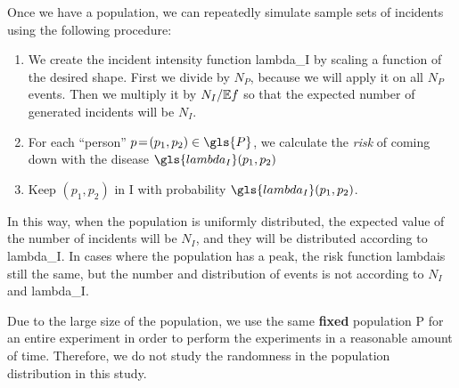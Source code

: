 Once we have a population,
we can repeatedly simulate sample sets of incidents using the following procedure:
\begin{enumerate}
    \item We create the incident intensity function \gls{lambda_I}
        by scaling a function of the desired shape.
        First we divide by $N_P$,
        because we will apply it on all $N_P$ \glspl{event}.
        Then we multiply it by $N_I/\mathbb{E} f$
        so that the expected number of generated \glspl{incident} will be $N_I$.
    \item For each ``person'' $p\!=\!(p_1, p_2) \in \gls{P}$,
        we calculate the \textit{risk} of coming down with the disease $\gls{lambda_I}(p_1, p_2)$
    \item Keep $(p_1, p_2)$ in \gls{I} with probability $\gls{lambda_I}(p_1, p_2)$.
\end{enumerate}

In this way,
when the population is uniformly distributed,
the expected value of the number of \glspl{incident} will be $N_I$,
and they will be distributed according to \gls{lambda_I}.
In cases where the population has a peak,
the risk function \gls{lambda}\dotdot is still the same,
but the number and distribution of events is not according to $N_I$ and \gls{lambda_I}.

Due to the large size of the population,
we use the same \textbf{fixed} population \gls{P} for an entire experiment
in order to perform the experiments in a reasonable amount of time.
Therefore,
we do not study the randomness in the population distribution in this study.